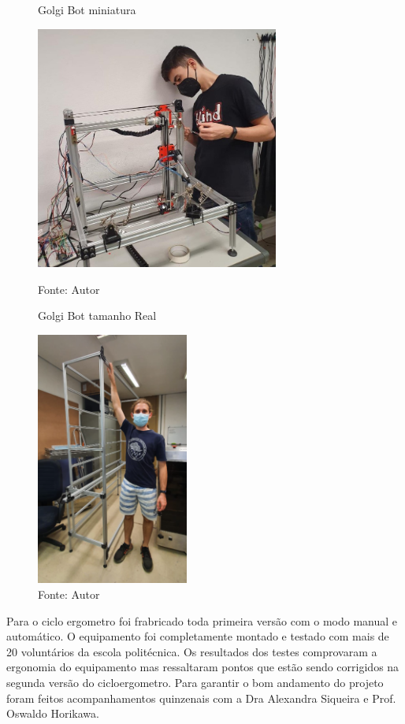 \documentclass[]{politex}
\begin{document}
\begin{figure}[h]
\centering
    \begin{minipage}{0.5\textwidth}
       \centering
        \caption{Golgi Bot miniatura}
        \centering %
        \includegraphics[width=8cm]{images/minigolgi.jpeg}
        \caption*{Fonte: Autor}
        \label{figura: Golgi Bot miniatura}
        
    \end{minipage}\hfill
    \begin{minipage}{0.5\textwidth}
        \centering
        \caption{Golgi Bot tamanho Real}
        \centering %
        \includegraphics[width=5cm]{images/gigagolgi.png}
        \caption*{Fonte: Autor}
        \label{figura: Golgi Bot tamanho Real}
    \end{minipage}\hfill
\end{figure}

Para o ciclo ergometro foi frabricado toda primeira versão com o modo manual e automático. O equipamento foi completamente montado e testado com mais de 20 voluntários da escola politécnica. Os resultados dos testes comprovaram a ergonomia do equipamento mas ressaltaram pontos que estão sendo corrigidos na segunda versão do cicloergometro. Para garantir o bom andamento do projeto foram feitos acompanhamentos quinzenais com a Dra Alexandra Siqueira e Prof. Oswaldo Horikawa.
\end{document}
